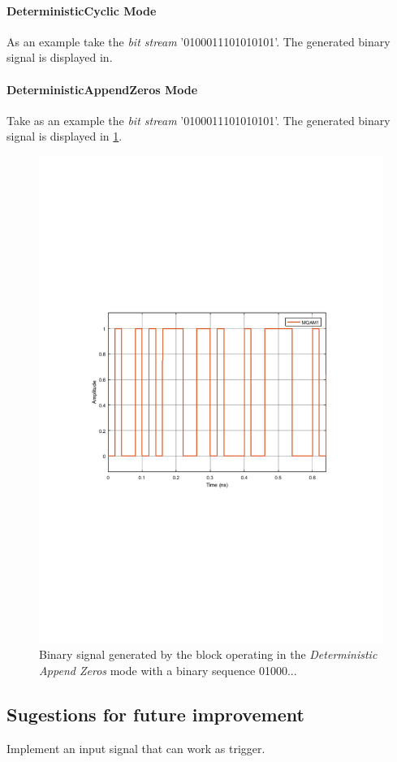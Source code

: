 \paragraph*{DeterministicCyclic Mode}

As an example take the \textit{bit stream} '0100011101010101'. The generated binary signal is displayed in.

\paragraph*{DeterministicAppendZeros Mode}

Take as an example the \textit{bit stream} '0100011101010101'. The generated binary signal is displayed in \ref{MQAM1_DeterministAppendZeros}.

\begin{figure}
	\centering
	\includegraphics[width=\textwidth]{./lib/binary_source/figures/BinarySource_output}
	
	\caption{Binary signal generated by the block operating in the \textit{Deterministic Append Zeros} mode with a binary sequence 01000...}\label{MQAM1_DeterministAppendZeros}
\end{figure}

\subsection*{Sugestions for future improvement}

Implement an input signal that can work as trigger.

